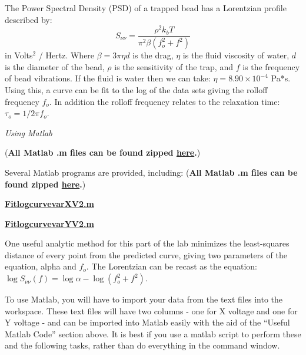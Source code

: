 \documentclass{../lab}
\begin{document}
The Power Spectral Density (PSD) \cite{Reif} of a trapped bead has a Lorentzian profile described by:
\begin{equation}
    S_{\nu\nu} = \frac{\rho^2 k_b T}{\pi^2 \beta(f_o^2+f^2)}
\end{equation}
in Volts$^2$ / Hertz. Where $\beta = 3\pi\eta d$ is the drag, $\eta$ is the fluid viscosity of water, $d$ is the diameter of the bead, $\rho$ is the sensitivity of the trap, and $f$ is the frequency of bead vibrations. If the fluid is water then we can take: $\eta = 8.90 \times 10^{-4}$ Pa*s. Using this, a curve can be fit to the log of the data sets giving the rolloff frequency $f_o$. In addition the rolloff frequency relates to the relaxation time: $\tau_o = 1/2\pi f_o$.

\emph{Using Matlab}

(\textbf{All Matlab .m files can be found zipped  \href{http://experimentationlab.berkeley.edu/sites/default/files/ZIP\_files/OTZ\_Matlab\_files.zip}{here}.})

Several Matlab programs are provided, including: (\textbf{All Matlab .m files can be found zipped  \href{http://experimentationlab.berkeley.edu/sites/default/files/ZIP\_files/OTZ\_Matlab\_files.zip}{here}.})

\href{http://experimentationlab.berkeley.edu/sites/default/files/matlab\_fitting/FitlogcurvevarXV2.m}{\textbf{FitlogcurvevarXV2.m}}

\href{http://experimentationlab.berkeley.edu/sites/default/files/matlab\_fitting/FitlogcurvevarYV2.m}{\textbf{FitlogcurvevarYV2.m}}

One useful analytic method for this part of the lab minimizes the least-squares distance of every point from the predicted curve, giving two parameters of the equation, alpha and $f_o$. The Lorentzian can be recast as the equation: $\log{S_{\nu\nu}(f)} = \log{\alpha} - \log{(f_o^2+f^2)}$.

To use Matlab, you will have to import your data from the text files into the workspace. These text files will have two columns - one for X voltage and one for Y voltage - and can be imported into Matlab easily with the aid of the ``Useful Matlab Code'' section above. It is best if you use a matlab script to perform these and the following tasks, rather than do everything in the command window.
\end{document}
